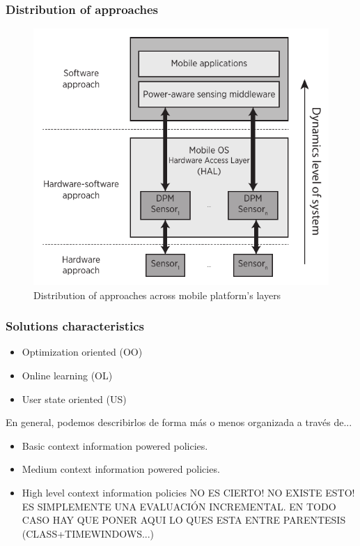 \documentclass[compress,9pt,xcolor={dvipsnames,table}]{beamer}
\begin{document}
\begin{frame}\frametitle{Distribution of approaches}
\begin{figure}[tb]
  \centering
  \includegraphics[scale=0.72]{../../../resources/images/vectors/approaches-distribution}
  \caption{Distribution of approaches across mobile platform's layers}
  \label{fig:distribution}
\end{figure}
\end{frame}


\begin{frame}[t]\frametitle{Solutions characteristics}
\begin{tcolorbox}[title=Distinctive characteristics of works,colframe=PineGreen]
\small
\begin{itemize}
  \item Optimization oriented (OO)
  \item Online learning (OL)
  \item User state oriented (US)
\end{itemize}
\end{tcolorbox}

En general, podemos describirlos de forma más o menos organizada a través de...
\begin{tcolorbox}[title=Granularity of context information (input data type + classifier + time window length),colframe=PineGreen]
\small
\begin{itemize}
  \item Basic context information powered policies.
  \item Medium context information powered policies.
  \item High level context information policies
  NO ES CIERTO! NO EXISTE ESTO! ES SIMPLEMENTE UNA EVALUACIÓN INCREMENTAL. EN TODO CASO HAY QUE PONER AQUI LO QUES ESTA ENTRE PARENTESIS (CLASS+TIMEWINDOWS...)
\end{itemize}
\end{tcolorbox}
\end{frame}
\end{document}
